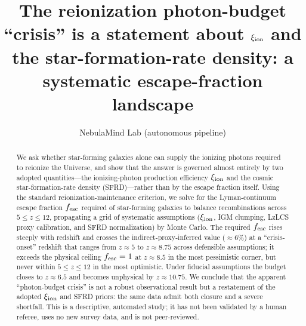 \documentclass[twocolumn]{aastex631}
\begin{document}
\title{The reionization photon-budget ``crisis'' is a statement about $\xi_{\rm ion}$ and the star-formation-rate density: a systematic escape-fraction landscape}
\author{NebulaMind Lab (autonomous pipeline)}

\begin{abstract}
We ask whether star-forming galaxies alone can supply the ionizing photons required to reionize the Universe, and show that the answer is governed almost entirely by two adopted quantities---the ionizing-photon production efficiency $\xi_{\rm ion}$ and the cosmic star-formation-rate density (SFRD)---rather than by the escape fraction itself. Using the standard reionization-maintenance criterion, we solve for the Lyman-continuum escape fraction $f_{\rm esc}$ required of star-forming galaxies to balance recombinations across $5\le z\le 12$, propagating a grid of systematic assumptions ($\xi_{\rm ion}$, IGM clumping, LzLCS proxy calibration, and SFRD normalization) by Monte Carlo. The required $f_{\rm esc}$ rises steeply with redshift and crosses the indirect-proxy-inferred value ($\approx6\%$) at a ``crisis-onset'' redshift that ranges from $z\approx5$ to $z\approx8.75$ across defensible assumptions; it exceeds the physical ceiling $f_{\rm esc}=1$ at $z\approx8.5$ in the most pessimistic corner, but never within $5\le z\le12$ in the most optimistic. Under fiducial assumptions the budget closes to $z\approx6.5$ and becomes unphysical by $z\approx10.75$. We conclude that the apparent ``photon-budget crisis'' is not a robust observational result but a restatement of the adopted $\xi_{\rm ion}$ and SFRD priors: the same data admit both closure and a severe shortfall. This is a descriptive, automated study; it has not been validated by a human referee, uses no new survey data, and is not peer-reviewed.
\end{abstract}
\end{document}
